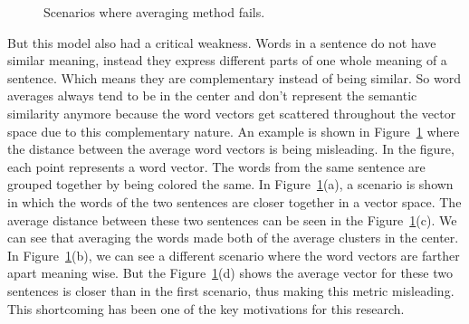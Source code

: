 \begin{figure}
    \centering
    
    \caption{Scenarios where averaging method fails.}
    \label{fig:sarkar-problem}
\end{figure}

But this model also had a critical weakness.
Words in a sentence do not have similar meaning, instead they express different parts of one whole meaning of a sentence.
Which means they are complementary instead of being similar.
So word averages always tend to be in the center and don't represent the semantic similarity anymore because the word
vectors get scattered throughout the vector space due to this complementary nature.
An example is shown in Figure~\ref{fig:sarkar-problem} where the distance between the average word vectors is being
misleading.
In the figure, each point represents a word vector.
The words from the same sentence are grouped together by being colored the same.
In Figure~\ref{fig:sarkar-problem}(a), a scenario is shown in which the words of the two sentences are closer
together in a vector space.
The average distance between these two sentences can be seen in the Figure~\ref{fig:sarkar-problem}(c).
We can see that averaging the words made both of the average clusters in the center.
In Figure~\ref{fig:sarkar-problem}(b), we can see a different scenario where the word vectors are farther apart meaning wise.
But the Figure~\ref{fig:sarkar-problem}(d) shows the average vector for these two sentences is closer than in the first
scenario, thus making this metric misleading.
This shortcoming has been one of the key motivations for this research.